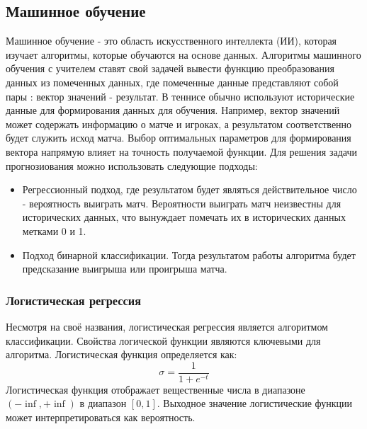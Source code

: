 \subsection{Машинное обучение}
Машинное обучение - это область искусственного интеллекта (ИИ), которая изучает алгоритмы, которые обучаются на основе данных.
Алгоритмы машинного обучения с учителем ставят свой задачей вывести  функцию преобразования данных из помеченных данных, где помеченные данные представляют собой пары : вектор значений  - результат.
В теннисе обычно используют исторические данные для формирования данных для обучения. Например, вектор значений может содержать информацию о матче и игроках, а результатом соответственно  будет служить исход матча. Выбор оптимальных параметров для формирования вектора напрямую влияет на точность получаемой функции.
Для решения задачи прогнозиования можно использовать следующие подходы:
\begin{itemize}
	\item Регрессионный подход, где результатом будет являться действительное число - вероятность выиграть матч. Вероятности выиграть матч неизвестны для исторических данных, что вынуждает помечать их в исторических данных метками 0 и 1.
	\item Подход бинарной классификации. Тогда результатом работы алгоритма будет предсказание выигрыша или проигрыша матча.
\end{itemize}
\break
\subsubsection{Логистическая регрессия}
Несмотря на своё названия, логистическая регрессия является алгоритмом классификации. Свойства логической функции являются ключевыми для алгоритма. Логистическая функция определяется как:
\begin{equation}\label{formula3}
\sigma=\frac{1}{1 + e^{-t}}
\end{equation}
Логистическая функция отображает 
вещественные числа в диапазоне $(-\inf, +\inf)$ в диапазон $[0,1]$. Выходное значение логистические функции может интерпретироваться как вероятность.

